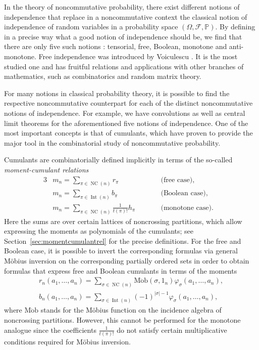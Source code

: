 \documentclass[pdftex]{sigma}%
\numberwithin{equation}{section}
\newcommand{\NC}{\operatorname{NC}}
\newcommand{\Int}{\operatorname{Int}}
\begin{document}
In the theory of noncommutative probability, there exist different notions of independence that replace in a noncommutative context the classical notion of independence of random variables in a probability space $(\Omega,\mathcal{F},\mathbb{P})$. By defining in a precise way what a good notion of independence should be, we find that there are only five such notions \cite{BGS,Mura03,Spe97}: tensorial, free, Boolean, monotone and anti-monotone. Free independence was introduced by Voiculescu \cite{Voi85}. It is the most studied one and has fruitful relations and applications with other branches of mathematics, such as combinatorics and random matrix theory.

For many notions in classical probability theory, it is possible to find the respective noncommutative counterpart for each of the distinct noncommutative notions of independence. For example, we have convolutions as well as central limit theorems for the aforementioned five notions of independence. One of the most important concepts is that of cumulants, which have proven to provide the major tool in the combinatorial study of noncommutative probability.

Cumulants are combinatorially defined implicitly in terms of the so-called \textit{moment-cumulant relations}
\begin{alignat*}{3}
& m_n = \sum_{\pi\in \NC(n)} r_\pi \qquad && \text{(free case)},& \\
& m_n = \sum_{\pi\in \Int(n)} b_\pi \qquad && \text{(Boolean case)}, &\\
& m_n = \sum_{\pi\in \NC(n)} \frac{1}{t(\pi)! }h_\pi \qquad && \text{(monotone case)}.&
\end{alignat*}
Here the sums are over certain lattices of noncrossing partitions, which allow expressing the moments as polynomials of the cumulants; see Section~\ref{sec:momentcumulantrel} for the precise definitions. For the free and Boolean case, it is possible to invert the corresponding formulas via general M\"obius inversion on the corresponding partially ordered sets in order to obtain formulas that express free and Boolean cumulants in terms of the moments
\begin{gather}
	\label{eq:freeCM}
	r_n(a_1,\dots,a_n)
	= \sum_{\sigma \in \NC(n)} \operatorname{M\ddot{o}b}(\sigma,1_n)\varphi_\sigma(a_1,\dots,a_n),
	\\ \label{eq:BoolCM}
	b_n(a_1,\dots,a_n)
	= \sum_{\sigma \in \Int(n)}(-1)^{|\sigma|-1}\varphi_\sigma(a_1,\dots,a_n),
\end{gather}
where $\mathrm{M\ddot{o}b}$ stands for the M\"obius function on the incidence algebra of noncrossing partitions. However, this cannot be performed for the monotone analogue since the coefficients $\frac{1}{t(\pi)!}$ do not satisfy certain multiplicative conditions required for M\"obius inversion.
\end{document}
